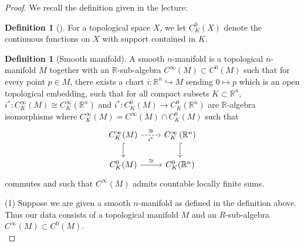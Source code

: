 \documentclass[reqno]{amsart}
\theoremstyle{definition}
\newtheorem{definition}[theorem]{Definition}
\theoremstyle{remark}
\begin{document}
    \begin{proof}
        We recall the definition given in the lecture:

        \begin{definition}[]
            For a topological space
            $X$, we let $C_K^{0}(X)$ denote the
            continuous functions on $X$ with support
            contained in $K$. 
        \end{definition}

        \begin{definition}[Smooth manifold]
            A smooth $n$-manifold is a topological $n$-manifold
            $M$ together with an $\mathbb{R}$-sub-algebra
            $C^{\infty}(M) \subset C^{0}(M)$ such that
            for every point $p \in M$, there exists
            a chart
            $i \colon \mathbb{R}^{n} \hookrightarrow 
            M$ sending $0 \mapsto p$ which is an open topological
            embedding, such that for all compact subsets
            $K \subset \mathbb{R}^{n}$, 
            $i^{*} \colon C_K^{\infty}(M)
            \cong C_K^{\infty}\left( \mathbb{R}^{n} \right) $ 
            and
            $i^{*} \colon
            C_K^{0}(M) \to C_K^{0}\left( \mathbb{R}^{n} \right) $
            are $\mathbb{R}$-algebra isomorphisms
            where $C_K^{\infty}(M) =
            C^{\infty}(M) \cap C_K^{0}(M)$ such that
            \begin{equation*}
            \begin{tikzcd}
                C_{K}^{\infty}(M) \ar[r, dashed, "\cong", "i^{*}"'] 
                \ar[d, hookrightarrow] &
                C_{K}^{\infty}\left( \mathbb{R}^{n} \right) 
                \ar[d, hookrightarrow] \\
                C_K^{0}(M) \ar[r, "\cong"] & C_K^{0}(\mathbb{R}^{n})
            \end{tikzcd}
            \end{equation*}
            commutes and such that
            $C^{\infty}(M)$ admits countable
            locally finite sums.
        \end{definition}

        (1) Suppose we are given a smooth
        $n$-manifold as defined in the definition
        above. Thus our data consists 
        of a topological manifold
        $M$ and an $R$-sub-algebra $C^{\infty}(M)
        \subset C^{0}(M)$.\\


\end{proof}
\end{document}
